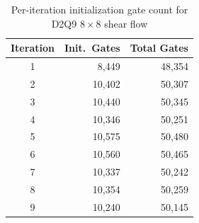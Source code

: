 \begin{table}[H]
\centering
\caption{Per-iteration initialization gate count for D2Q9 $8{\times}8$ shear flow}
\label{tab:init_per_iter}
\begin{tabular}{c r r}
\toprule
Iteration & Init.\ Gates & Total Gates \\
\midrule
1 & 8,449 & 48,354 \\
2 & 10,402 & 50,307 \\
3 & 10,440 & 50,345 \\
4 & 10,346 & 50,251 \\
5 & 10,575 & 50,480 \\
6 & 10,560 & 50,465 \\
7 & 10,337 & 50,242 \\
8 & 10,354 & 50,259 \\
9 & 10,240 & 50,145 \\
\bottomrule
\end{tabular}
\end{table}
